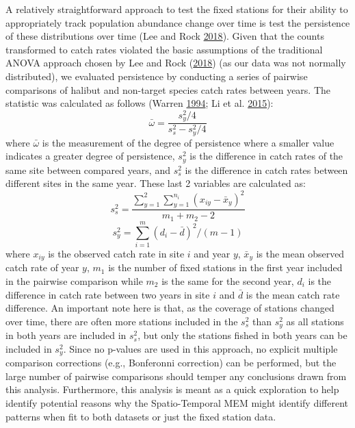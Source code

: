 \documentclass[12pt]{article}\usepackage[]{graphicx}\usepackage[]{color}
\begin{document}
A relatively straightforward approach to test the fixed stations for their ability to appropriately track population abundance change over time is test the persistence of these distributions over time (Lee and Rock \protect\hyperlink{ref-Lee2018}{2018}). Given that the counts transformed to catch rates violated the basic assumptions of the traditional ANOVA approach chosen by Lee and Rock (\protect\hyperlink{ref-Lee2018}{2018}) (as our data was not normally distributed), we evaluated persistence by conducting a series of pairwise comparisons of halibut and non-target species catch rates between years. The statistic was calculated as follows (Warren \protect\hyperlink{ref-Warren1994}{1994}; Li et al. \protect\hyperlink{ref-Li2015}{2015}):
\begin{equation}
\bar{\omega} = \frac{s^2_y/4}{s^2_s-s^2_y/4}
\end{equation}
where \(\bar{\omega}\) is the measurement of the degree of persistence where a smaller value indicates a greater degree of persistence, \(s^2_y\) is the difference in catch rates of the same site between compared years, and \(s^2_s\) is the difference in catch rates between different sites in the same year. These last 2 variables are calculated as:
\begin{equation}
s^2_s = \frac{\sum_{y=1}^2 \sum_{y=1}^{n_i} (x_{iy}-\bar{x}_y)^2}{m_1+m_2-2}
\end{equation} \begin{equation}
s^2_y = \sum_{i=1}^m (d_i - \bar{d})^2 / (m-1)
\end{equation}
where \(x_{iy}\) is the observed catch rate in site \(i\) and year \(y\), \(\bar{x}_y\) is the mean observed catch rate of year \(y\), \(m_1\) is the number of fixed stations in the first year included in the pairwise comparison while \(m_2\) is the same for the second year, \(d_i\) is the difference in catch rate between two years in site \(i\) and \(\bar{d}\) is the mean catch rate difference. An important note here is that, as the coverage of stations changed over time, there are often more stations included in the \(s^2_s\) than \(s^2_y\) as all stations in both years are included in \(s^2_s\), but only the stations fished in both years can be included in \(s^2_y\). Since no p-values are used in this approach, no explicit multiple comparison corrections (e.g., Bonferonni correction) can be performed, but the large number of pairwise comparisons should temper any conclusions drawn from this analysis. Furthermore, this analysis is meant as a quick exploration to help identify potential reasons why the Spatio-Temporal MEM might identify different patterns when fit to both datasets or just the fixed station data.
\end{document}
